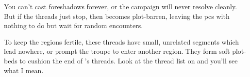 
You can't cast foreshadows forever, or the \gls{campaign} will never resolve cleanly.
But if the \glspl{thread} just stop, then  becomes plot-barren, leaving the \glspl{pc} with nothing to do but wait for random encounters.

To keep the \glspl{region} fertile, these \glspl{thread} have small, unrelated \glspl{segment} which lead nowhere, or prompt the troupe to enter another \gls{region}.
They form soft plot-beds to cushion the end of 's \glspl{thread}.
Look at the \gls{thread} list on  and you'll see what I mean.
